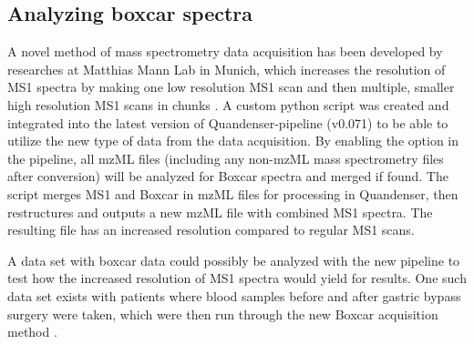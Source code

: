 \subsection{Analyzing boxcar spectra}
A novel method of mass spectrometry data acquisition has been developed by researches at Matthias Mann Lab in Munich, which increases the resolution of MS1 spectra by making one low resolution MS1 scan and then multiple, smaller high resolution MS1 scans in chunks \cite{boxcar}. A custom python script was created and integrated into the latest version of Quandenser-pipeline (v0.071) to be able to utilize the new type of data from the data acquisition. By enabling the option in the pipeline, all mzML files (including any non-mzML mass spectrometry files after conversion) will be analyzed for Boxcar spectra and merged if found. The script merges MS1 and Boxcar in mzML files for processing in Quandenser, then restructures and outputs a new mzML file with combined MS1 spectra. The resulting file has an increased resolution compared to regular MS1 scans.

A data set with boxcar data could possibly be analyzed with the new pipeline to test how the increased resolution of MS1 spectra would yield for results. One such data set exists with patients where blood samples before and after gastric bypass surgery were taken, which were then run through the new Boxcar acquisition method \cite{boxcar-data}.
